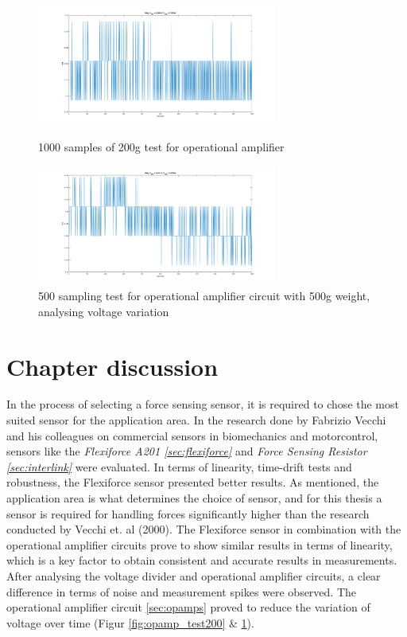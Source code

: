 \begin{figure}[!htb]
   \begin{minipage}{0.470\textwidth}
     \centering
     \includegraphics[width=0.7\textwidth]{figures/opamp_Vdiff_200g.png}
     \caption{1000 samples of 200g test for operational amplifier}
     \label{fig:opamp_test200}
   \end{minipage}\hfill
   \begin{minipage}{0.470\textwidth}
     \centering
     \includegraphics[width=0.7\textwidth]{figures/opamp_Vdiff_500g.png}
     \caption{500 sampling test for operational amplifier circuit with 500g weight, analysing voltage variation}
     \label{fig:opamp_test500}
   \end{minipage}
\end{figure}




\section{Chapter discussion}
\label{sec:circuitdisc}
In the process of selecting a force sensing sensor, it is required to chose the most suited sensor for the application area. In the research done by Fabrizio Vecchi and his colleagues \citep{vecchi_experimental_2000} on commercial sensors in biomechanics and motorcontrol, sensors like the \textit{Flexiforce A201 \ref{sec:flexiforce}} and \textit{Force Sensing Resistor \ref{sec:interlink}} were evaluated. In terms of linearity, time-drift tests and robustness, the Flexiforce sensor presented better results. As mentioned, the application area is what determines the choice of sensor, and for this thesis a sensor is required for handling forces significantly higher than the research conducted by Vecchi et. al (2000). The Flexiforce sensor in combination with the operational amplifier circuits prove to show similar results in terms of linearity, which is a key factor to obtain consistent and accurate results in measurements. After analysing the voltage divider and operational amplifier circuits, a clear difference in terms of noise and measurement spikes were observed. The operational amplifier circuit \ref{sec:opamps} proved to reduce the variation of voltage over time (Figur \ref{fig:opamp_test200} \& \ref{fig:opamp_test500}).


